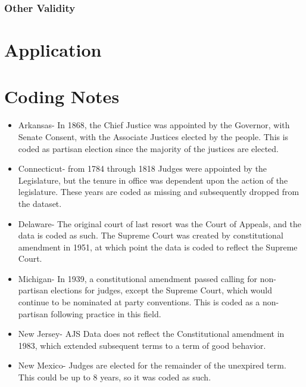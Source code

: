 \documentclass[12pt]{article}
\begin{document}
\subsubsection*{Other Validity}

\section*{Application}



\singlespacing


\appendix
\section{Coding Notes}\label{CodingNotes}
\begin{itemize}
	\item Arkansas- In 1868, the Chief Justice was appointed by the Governor, with Senate Consent, with the Associate Justices elected by the people.  This is coded as partisan election since the majority of the justices are elected.
	
	\item Connecticut- from 1784 through 1818 Judges were appointed by the Legislature, but the tenure in office was dependent upon the action of the legislature.  These years are coded as missing and subsequently dropped from the dataset.
	
	\item Delaware- The original court of last resort was the Court of Appeals, and the data is coded as such.  The Supreme Court was created by constitutional amendment in 1951, at which point the data is coded to reflect the Supreme Court.
	
	\item Michigan- In 1939, a constitutional amendment passed calling for non-partisan elections for judges, except the Supreme Court, which would continue to be nominated at party conventions.  This is coded as a non-partisan following practice in this field.
	
	\item New Jersey- AJS Data does not reflect the Constitutional amendment in 1983, which extended subsequent terms to a term of good behavior.
	
	\item New Mexico- Judges are elected for the remainder of the unexpired term.  This could be up to 8 years, so it was coded as such.
	

\end{itemize}
\end{document}
